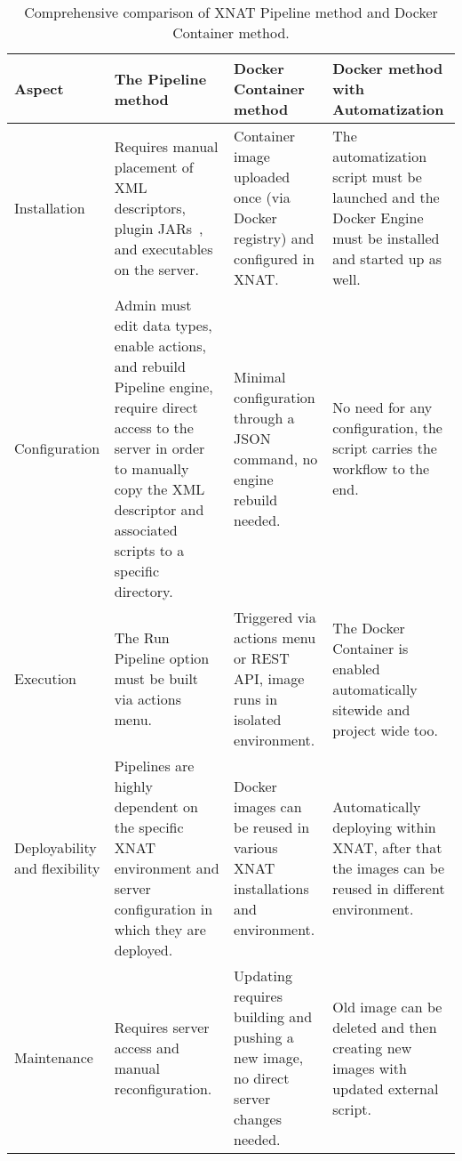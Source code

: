 \begin{table}[H]
  \centering
  \caption{Comprehensive comparison of XNAT Pipeline method and Docker Container method.}
  \label{tab:pipeline-vs-docker}

  \begin{tabular}{|>{\centering\arraybackslash}p{2cm}|
                      >{\centering\arraybackslash}p{4cm}|
                      >{\centering\arraybackslash}p{4cm}|
                      >{\centering\arraybackslash}p{4cm}|}
    \hline
    \textbf{Aspect} & \textbf{The Pipeline method} & \textbf{Docker Container method} & \textbf{Docker method with Automatization }\\ \hline
    
    
    Installation & Requires manual placement of XML descriptors, plugin JARs~\cite{installpipeline}, and executables on the server. & Container image uploaded once (via Docker registry) and configured in XNAT. & The automatization script must be launched and the Docker Engine must be installed and started up as well. \\ \hline
    

    
    Configuration & Admin must edit data types, enable actions, and rebuild Pipeline engine, require direct access to the server in order to manually copy the XML descriptor and associated scripts to a specific directory. & Minimal configuration through a JSON command, no engine rebuild needed. & No need for any configuration, the script carries the workflow to the end. \\ \hline
    
    Execution & The Run Pipeline option must be built via actions menu. & Triggered via actions menu or REST API, image runs in isolated environment. & The Docker Container is enabled automatically sitewide and project wide too. \\ \hline

    Deployability and flexibility & Pipelines are highly dependent on the specific XNAT environment and server configuration in which they are deployed. & Docker images can be reused in various XNAT installations and environment. & Automatically deploying within XNAT, after that the images can be reused in different environment. \\ \hline
    
    Maintenance & Requires server access and manual reconfiguration. & Updating requires building and pushing a new image, no direct server changes needed. & Old image can be deleted and then creating new images with updated external script.\\ \hline
    

\end{tabular}
\end{table}
